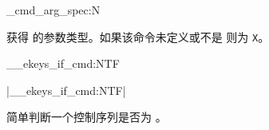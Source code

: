 \documentclass{cusdoc}
\begin{document}
\begin{function}[EXP,added=2025/10/10]{\ekeys_cmd_arg_spec:N}
  \begin{syntax}
     
  \end{syntax}
获得  的参数类型。如果该命令未定义或不是  则为 \texttt{X}。
\end{function}

\begin{function}[EXP]{\__ekeys_if_cmd:NTF}
  \begin{syntax}
    \V*|\__ekeys_if_cmd:NTF|   
  \end{syntax}
简单判断一个控制序列是否为 。
\end{function}

\smallskip
\end{document}
